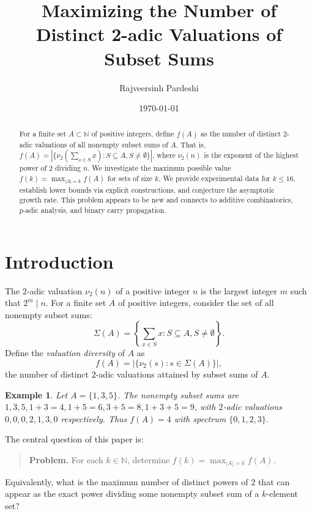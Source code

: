 \documentclass[11pt]{article}
\title{Maximizing the Number of Distinct 2-adic Valuations of Subset Sums}
\author{Rajveersinh Pardeshi}
\date{\today}
\newtheorem{example}[theorem]{Example}
\newcommand{\vtwo}{\nu_2}
\newcommand{\NN}{\mathbb{N}}
\begin{document}
\maketitle

\begin{abstract}
For a finite set $A \subset \NN$ of positive integers, define $f(A)$ as the number of distinct $2$-adic valuations of all nonempty subset sums of $A$. 
That is, $f(A) = |\{\vtwo(\sum_{x \in S} x) : S \subseteq A, S \neq \emptyset\}|$, where $\vtwo(n)$ is the exponent of the highest power of $2$ dividing $n$.
We investigate the maximum possible value $f(k) = \max_{|A|=k} f(A)$ for sets of size $k$.
We provide experimental data for $k \le 16$, establish lower bounds via explicit constructions,
and conjecture the asymptotic growth rate. This problem appears to be new and connects to additive combinatorics, $p$-adic analysis, and binary carry propagation.
\end{abstract}

\section{Introduction}

The $2$-adic valuation $\vtwo(n)$ of a positive integer $n$ is the largest integer $m$ such that $2^m \mid n$. 
For a finite set $A$ of positive integers, consider the set of all nonempty subset sums:
\[
\Sigma(A) = \left\{ \sum_{x \in S} x : S \subseteq A, S \neq \emptyset \right\}.
\]
Define the \emph{valuation diversity} of $A$ as
\[
f(A) = |\{ \vtwo(s) : s \in \Sigma(A) \}|,
\]
the number of distinct $2$-adic valuations attained by subset sums of $A$.

\begin{example}
Let $A = \{1, 3, 5\}$. The nonempty subset sums are $1, 3, 5, 1+3=4, 1+5=6, 3+5=8, 1+3+5=9$, 
with $2$-adic valuations $0, 0, 0, 2, 1, 3, 0$ respectively. Thus $f(A) = 4$ with spectrum $\{0,1,2,3\}$.
\end{example}

The central question of this paper is:

\begin{quote}
\textbf{Problem.} For each $k \in \NN$, determine $f(k) = \max_{|A|=k} f(A)$.
\end{quote}

Equivalently, what is the maximum number of distinct powers of $2$ that can appear as the exact power dividing some nonempty subset sum of a $k$-element set?
\end{document}
